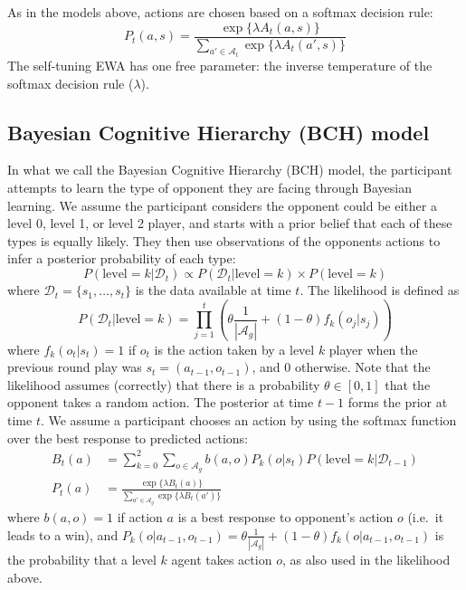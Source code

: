 \documentclass[man,floatsintext]{apa6}
\begin{document}
As in the models above, actions are chosen based on a softmax decision rule:
\[P_t(a,s) = \frac{\exp \{\lambda  A_{t}(a,s) \} }{\sum_{a' \in \mathcal{A}_t} \exp \{ \lambda A_{t}(a',s) \} }\]
The self-tuning EWA has one free parameter: the inverse temperature of the softmax decision rule (\(\lambda\)).

\subsection{Bayesian Cognitive Hierarchy (BCH) model}

In what we call the Bayesian Cognitive Hierarchy (BCH) model, the participant attempts to learn the type of opponent they are facing through Bayesian learning. We assume the participant considers the opponent could be either a level 0, level 1, or level 2 player, and starts with a prior belief that each of these types is equally likely. They then use observations of the opponents actions to infer a posterior probability of each type:
\[P(\text{level}=k | \mathcal{D}_{t})  \propto  P(\mathcal{D}_{t}|\text{level}=k ) \times P(\text{level}=k)\]
where \(\mathcal{D}_{t} = \{s_1,\ldots,s_t\}\) is the data available at time \(t\). The likelihood is defined as
\[P(\mathcal{D}_{t}|\text{level}=k) = \prod_{j=1}^t \left( \theta \frac{1}{|\mathcal{A}_g|} + (1-\theta) f_k(o_j|s_{j})\right)\]
where \(f_k(o_t|s_{t}) = 1\) if \(o_t\) is the action taken by a level \(k\) player when the previous round play was \(s_t = (a_{t-1}, o_{t-1})\), and 0 otherwise. Note that the likelihood assumes (correctly) that there is a probability \(\theta \in [0,1]\) that the opponent takes a random action. The posterior at time \(t-1\) forms the prior at time \(t\). We assume a participant chooses an action by using the softmax function over the best response to predicted actions:
\[\begin{aligned} B_t(a) &= \sum_{k = 0}^2 \sum_{o \in \mathcal{A}_g} b(a,o) P_k(o|s_{t})  P(\text{level}=k|\mathcal{D}_{t-1})\\
P_t(a) &= \frac{\exp\{\lambda B_t(a) \}}{\sum_{a' \in \mathcal{A}_g} \exp \{ \lambda B_t(a')\}} \end{aligned}\]
where \(b(a,o) = 1\) if action \(a\) is a best response to opponent's action \(o\) (i.e.~it leads to a win), and \(P_k(o|a_{t-1},o_{t-1}) = \theta \frac{1}{|\mathcal{A}_g|} + (1-\theta) f_k(o|a_{t-1},o_{t-1})\) is the probability that a level \(k\) agent takes action \(o\), as also used in the likelihood above.
\end{document}
